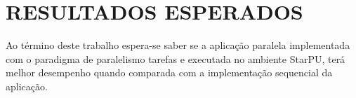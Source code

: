 
\chapter{RESULTADOS ESPERADOS}
\label{chap:resultados-esperados}

Ao término deste trabalho espera-se saber se a aplicação paralela implementada com o paradigma de paralelismo tarefas e executada no ambiente StarPU,
terá melhor desempenho quando comparada com a implementação sequencial da aplicação.